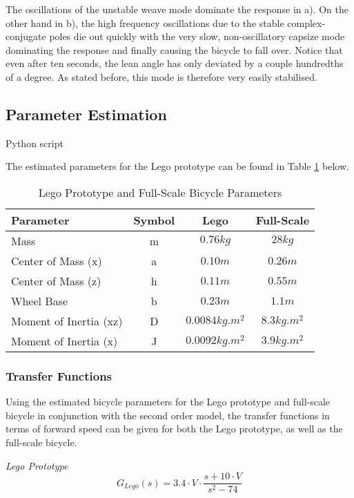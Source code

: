 The oscillations of the unstable weave mode dominate the response in a). On the other hand in b), the high frequency oscillations due to the stable complex-conjugate poles die out quickly with the very slow, non-oscillatory capsize mode dominating the response and finally causing the bicycle to fall over. Notice that even after ten seconds, the lean angle has only deviated by a couple hundredths of a degree. As stated before, this mode is therefore very easily stabilised. 

\subsection{Parameter Estimation}
Python script

The estimated parameters for the Lego prototype can be found in Table \ref{table:LegoFSParams} below.

\begin{table}[H]
	\centering
 	\begin{tabular}[t]{lccc} 
	\toprule
	Parameter & Symbol & Lego & Full-Scale \\
 	\midrule
 	Mass & m & $0.76\si{kg}$ & $28\si{kg}$\\
 	Center of Mass (x) & a & $0.10\si{m}$ & $0.26\si{m}$\\ 
 	Center of Mass (z) & h & $0.11\si{m}$ & $0.55\si{m}$\\
 	Wheel Base & b & $0.23\si{m}$ & $1.1\si{m}$\\
 	Moment of Inertia (xz) & D & $0.0084\si{kg.m^2}$ & $8.3\si{kg.m^2}$\\
 	Moment of Inertia (x)& J & $0.0092\si{kg.m^2}$ & $3.9\si{kg.m^2}$\\
 	\bottomrule
	\end{tabular}
 	\caption{Lego Prototype and Full-Scale Bicycle Parameters}
	\label{table:LegoFSParams}
\end{table}

\subsubsection{Transfer Functions}
Using the estimated bicycle parameters for the Lego prototype and full-scale bicycle in conjunction with the second order model, the transfer functions in terms of forward speed can be given for both the Lego prototype, as well as the full-scale bicycle.

\textit{Lego Prototype} \\

\begin{equation}
G_{Lego}(s) = 3.4 \cdot V \cdot \frac{s + 10 \cdot V}{s^2 - 74}
\label{eq:2ndOrderLego}
\end{equation}

